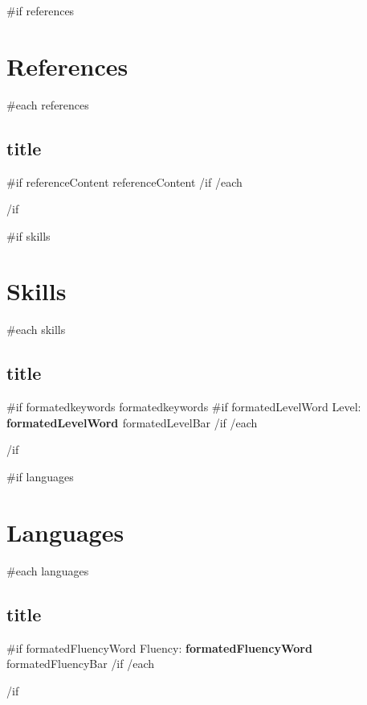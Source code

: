 \documentclass{article}
\begin{document}
{{#if references}}
\section*{References} {
  {{#each references}}
    \subsection*{ {{ title }} } {
      {{#if referenceContent}}{{ referenceContent }}{{/if}}\ignorespaces
    }
  {{/each}}
}{{/if}}\ignorespaces

{{#if skills}}\section*{Skills}{
  {{#each skills}}
    \subsection*{ {{ title }} } {
      {{#if formatedkeywords}}{{ formatedkeywords }}\ignorespaces
      {{#if formatedLevelWord}}
        Level: {\bfseries {{ formatedLevelWord }} } \newline
        {{ formatedLevelBar }} \newline
      {{/if}}\ignorespaces
    }
  {{/each}}
}{{/if}}\ignorespaces

{{#if languages}}\section*{Languages}{
  {{#each languages}}
    \subsection*{ {{ title }} } {
      {{#if formatedFluencyWord}}
        Fluency: {\bfseries {{ formatedFluencyWord }} } \newline
        {{ formatedFluencyBar }} \newline
      {{/if}}\ignorespaces
    }
  {{/each}}
}{{/if}}\ignorespaces
\end{document}
